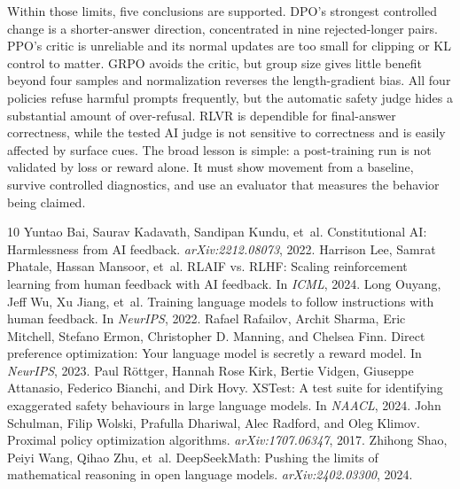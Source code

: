 \documentclass{article}
\begin{document}
Within those limits, five conclusions are supported. DPO's strongest controlled change is a shorter-answer direction, concentrated in nine rejected-longer pairs. PPO's critic is unreliable and its normal updates are too small for clipping or KL control to matter. GRPO avoids the critic, but group size gives little benefit beyond four samples and normalization reverses the length-gradient bias. All four policies refuse harmful prompts frequently, but the automatic safety judge hides a substantial amount of over-refusal. RLVR is dependible for final-answer correctness, while the tested AI judge is not sensitive to correctness and is easily affected by surface cues. The broad lesson is simple: a post-training run is not validated by loss or reward alone. It must show movement from a baseline, survive controlled diagnostics, and use an evaluator that measures the behavior being claimed.

\small
\begin{thebibliography}{10}
Yuntao Bai, Saurav Kadavath, Sandipan Kundu, et~al. Constitutional AI: Harmlessness from AI feedback. \emph{arXiv:2212.08073}, 2022.
Harrison Lee, Samrat Phatale, Hassan Mansoor, et~al. RLAIF vs. RLHF: Scaling reinforcement learning from human feedback with AI feedback. In \emph{ICML}, 2024.
Long Ouyang, Jeff Wu, Xu Jiang, et~al. Training language models to follow instructions with human feedback. In \emph{NeurIPS}, 2022.
Rafael Rafailov, Archit Sharma, Eric Mitchell, Stefano Ermon, Christopher D. Manning, and Chelsea Finn. Direct preference optimization: Your language model is secretly a reward model. In \emph{NeurIPS}, 2023.
Paul R{\"o}ttger, Hannah Rose Kirk, Bertie Vidgen, Giuseppe Attanasio, Federico Bianchi, and Dirk Hovy. XSTest: A test suite for identifying exaggerated safety behaviours in large language models. In \emph{NAACL}, 2024.
John Schulman, Filip Wolski, Prafulla Dhariwal, Alec Radford, and Oleg Klimov. Proximal policy optimization algorithms. \emph{arXiv:1707.06347}, 2017.
Zhihong Shao, Peiyi Wang, Qihao Zhu, et~al. DeepSeekMath: Pushing the limits of mathematical reasoning in open language models. \emph{arXiv:2402.03300}, 2024.
\end{thebibliography}
\end{document}
